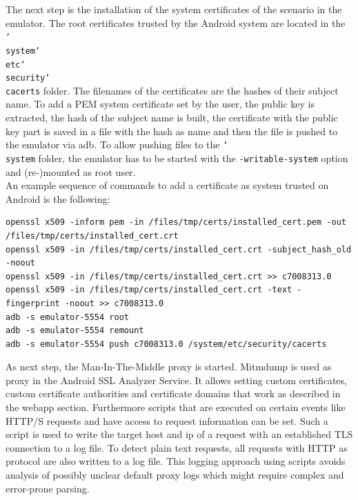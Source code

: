 \documentclass[draft,final]{vutinfth} %
\begin{document}
The next step is the installation of the system certificates of the scenario in the emulator. The root certificates trusted by the Android system are located in the \texttt{\char`\\system\char`\\etc\char`\\security\char`\\cacerts} folder. The filenames of the certificates are the hashes of their subject name. To add a PEM system certificate set by the user, the public key is extracted, the hash of the subject name is built, the certificate with the public key part is saved in a file with the hash as name and then the file is pushed to the emulator via adb. To allow pushing files to the \texttt{\char`\\system} folder, the emulator has to be started with the \texttt{-writable-system} option and (re-)mounted as root user.\\
An example sequence of commands to add a certificate as system trusted on Android is the following:
\begin{lstlisting}[caption={(Specific) commands for adding system trusted certificate},label={lst:static_smali},frame=tb,columns=fullflexible,breaklines]
openssl x509 -inform pem -in /files/tmp/certs/installed_cert.pem -out /files/tmp/certs/installed_cert.crt
openssl x509 -in /files/tmp/certs/installed_cert.crt -subject_hash_old -noout
openssl x509 -in /files/tmp/certs/installed_cert.crt >> c7008313.0
openssl x509 -in /files/tmp/certs/installed_cert.crt -text -fingerprint -noout >> c7008313.0
adb -s emulator-5554 root
adb -s emulator-5554 remount
adb -s emulator-5554 push c7008313.0 /system/etc/security/cacerts
\end{lstlisting}

As next step, the Man-In-The-Middle proxy is started. Mitmdump \cite{Mitmproxy} is used as proxy in the Android SSL Analyzer Service. It allows setting custom certificates, custom certificate authorities and certificate domains that work as described in the webapp section. Furthermore scripts that are executed on certain events like HTTP/S requests and have access to request information can be set. Such a script is used to write the target host and ip of a request with an established TLS connection to a log file. To detect plain text requests, all requests with HTTP as protocol are also written to a log file. This logging approach using scripts avoids analysis of possibly unclear default proxy logs which might require complex and error-prone parsing.
\end{document}
